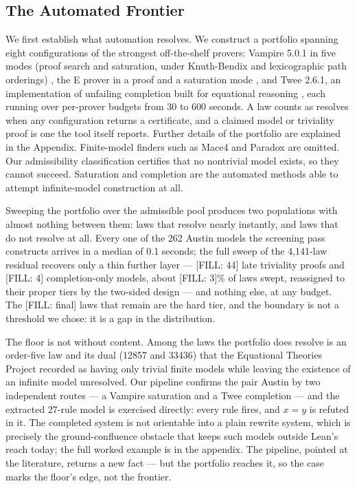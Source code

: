 \documentclass[letterpaper]{article} %
\begin{document}
\subsection{The Automated Frontier}

We first establish what automation resolves. We construct a portfolio spanning eight configurations of the strongest off-the-shelf provers: Vampire 5.0.1 in five modes (proof search and saturation, under Knuth-Bendix and lexicographic path orderings) \citep{kovacs2013first}, the E prover in a proof and a saturation mode \citep{schulz2019faster}, and Twee 2.6.1, an implementation of unfailing completion built for equational reasoning \citep{smallbone2021twee}, each running over per-prover budgets from 30 to 600 seconds. A law counts as resolves when any configuration returns a certificate, and a claimed model or triviality proof is one the tool itself reports. Further details of the portfolio are explained in the Appendix. Finite-model finders such as Mace4 \citep{...} and Paradox \citep{...} are omitted. Our admissibility classification certifies that no nontrivial model exists, so they cannot succeed. Saturation and completion are the automated methods able to attempt infinite-model construction at all. 

Sweeping the portfolio over the admissible pool produces two populations with almost nothing between them: laws that resolve nearly instantly, and laws that do not resolve at all. Every one of the 262 Austin models the screening pass constructs arrives in a median of 0.1 seconds; the full sweep of the 4,141-law residual recovers only a thin further layer — [FILL: 44] late triviality proofs and [FILL: 4] completion-only models, about [FILL: 3]\% of laws swept, reassigned to their proper tiers by the two-sided design — and nothing else, at any budget. The [FILL: final] laws that remain are the hard tier, and the boundary is not a threshold we chose: it is a gap in the distribution.
 
The floor is not without content. Among the laws the portfolio does resolve is an order-five law and its dual (12857 and 33436) that the Equational Theories Project recorded as having only trivial finite models while leaving the existence of an infinite model unresolved. Our pipeline confirms the pair Austin by two independent routes — a Vampire saturation and a Twee completion — and the extracted 27-rule model is exercised directly: every rule fires, and $x = y$ is refuted in it. The completed system is not orientable into a plain rewrite system, which is precisely the ground-confluence obstacle that keeps such models outside Lean's reach today; the full worked example is in the appendix. The pipeline, pointed at the literature, returns a new fact — but the portfolio reaches it, so the case marks the floor's edge, not the frontier.
 
\end{document}
